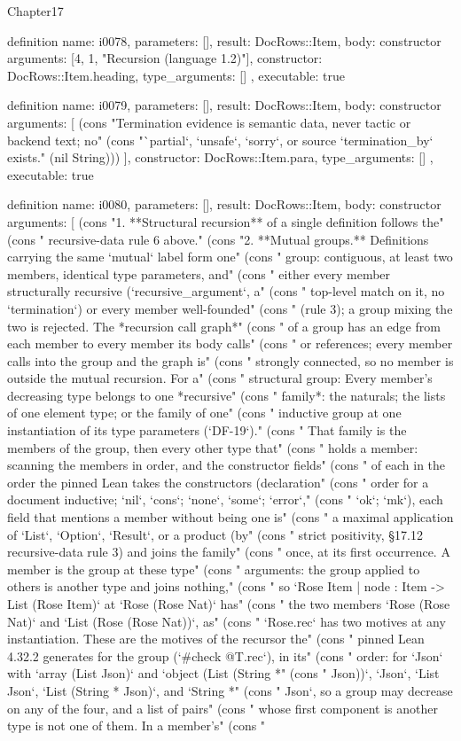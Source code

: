 \begin{lexlean}{Chapter17}
\begin{semanticmodule}
definition{
  name: i0078,
  parameters: [],
  result: DocRows::Item,
  body: constructor{
    arguments: [4, 1, "Recursion (language 1.2)"],
    constructor: DocRows::Item.heading,
    type_arguments: []
  },
  executable: true
}

definition{
  name: i0079,
  parameters: [],
  result: DocRows::Item,
  body: constructor{
    arguments: [
      (cons "Termination evidence is semantic data, never tactic or backend text; no" (cons "`partial`, `unsafe`, `sorry`, or source `termination_by` exists." (nil String)))
    ],
    constructor: DocRows::Item.para,
    type_arguments: []
  },
  executable: true
}

definition{
  name: i0080,
  parameters: [],
  result: DocRows::Item,
  body: constructor{
    arguments: [
      (cons "1. **Structural recursion** of a single definition follows the" (cons "   recursive-data rule 6 above." (cons "2. **Mutual groups.** Definitions carrying the same `mutual` label form one" (cons "   group: contiguous, at least two members, identical type parameters, and" (cons "   either every member structurally recursive (`recursive_argument`, a" (cons "   top-level match on it, no `termination`) or every member well-founded" (cons "   (rule 3); a group mixing the two is rejected. The *recursion call graph*" (cons "   of a group has an edge from each member to every member its body calls" (cons "   or references; every member calls into the group and the graph is" (cons "   strongly connected, so no member is outside the mutual recursion. For a" (cons "   structural group: Every member's decreasing type belongs to one *recursive" (cons "   family*: the naturals; the lists of one element type; or the family of one" (cons "   inductive group at one instantiation of its type parameters (`DF-19`)." (cons "   That family is the members of the group, then every other type that" (cons "   holds a member: scanning the members in order, and the constructor fields" (cons "   of each in the order the pinned Lean takes the constructors (declaration" (cons "   order for a document inductive; `nil`, `cons`; `none`, `some`; `error`," (cons "   `ok`; `mk`), each field that mentions a member without being one is" (cons "   a maximal application of `List`, `Option`, `Result`, or a product (by" (cons "   strict positivity, §17.12 recursive-data rule 3) and joins the family" (cons "   once, at its first occurrence. A member is the group at these type" (cons "   arguments: the group applied to others is another type and joins nothing," (cons "   so `Rose Item | node : Item -> List (Rose Item)` at `Rose (Rose Nat)` has" (cons "   the two members `Rose (Rose Nat)` and `List (Rose (Rose Nat))`, as" (cons "   `Rose.rec` has two motives at any instantiation. These are the motives of the recursor the" (cons "   pinned Lean 4.32.2 generates for the group (`#check @T.rec`), in its" (cons "   order: for `Json` with `array (List Json)` and `object (List (String *" (cons "   Json))`, `Json`, `List Json`, `List (String * Json)`, and `String *" (cons "   Json`, so a group may decrease on any of the four, and a list of pairs" (cons "   whose first component is another type is not one of them. In a member's" (cons "   }}
\end{semanticmodule}
\end{lexlean}
